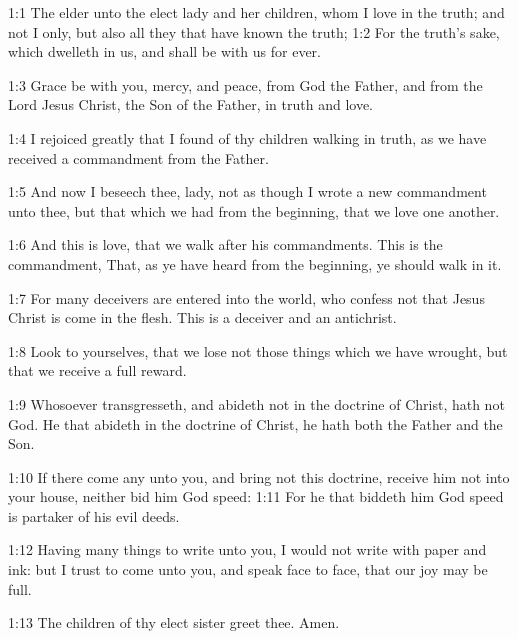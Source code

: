 

1:1 The elder unto the elect lady and her children, whom I love in the truth; and not I only, but also all they that have known the truth; 1:2 For the truth's sake, which dwelleth in us, and shall be with us for ever.

1:3 Grace be with you, mercy, and peace, from God the Father, and from the Lord Jesus Christ, the Son of the Father, in truth and love.

1:4 I rejoiced greatly that I found of thy children walking in truth, as we have received a commandment from the Father.

1:5 And now I beseech thee, lady, not as though I wrote a new commandment unto thee, but that which we had from the beginning, that we love one another.

1:6 And this is love, that we walk after his commandments. This is the commandment, That, as ye have heard from the beginning, ye should walk in it.

1:7 For many deceivers are entered into the world, who confess not that Jesus Christ is come in the flesh. This is a deceiver and an antichrist.

1:8 Look to yourselves, that we lose not those things which we have wrought, but that we receive a full reward.

1:9 Whosoever transgresseth, and abideth not in the doctrine of Christ, hath not God. He that abideth in the doctrine of Christ, he hath both the Father and the Son.

1:10 If there come any unto you, and bring not this doctrine, receive him not into your house, neither bid him God speed: 1:11 For he that biddeth him God speed is partaker of his evil deeds.

1:12 Having many things to write unto you, I would not write with paper and ink: but I trust to come unto you, and speak face to face, that our joy may be full.

1:13 The children of thy elect sister greet thee. Amen.


